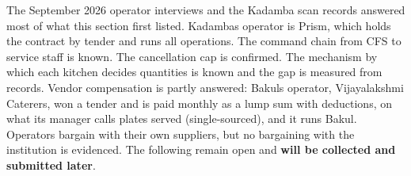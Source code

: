 \documentclass[
  10pt,
  table]{article}
\begin{document}
The September 2026 operator interviews and the Kadamba scan records answered most of what this section first listed. Kadamba\textquotesingle s operator is Prism, which holds the contract by tender and runs all operations. The command chain from CFS to service staff is known. The cancellation cap is confirmed. The mechanism by which each kitchen decides quantities is known and the gap is measured from records. Vendor compensation is partly answered: Bakul\textquotesingle s operator, Vijayalakshmi Caterers, won a tender and is paid monthly as a lump sum with deductions, on what its manager calls plates served (single-sourced), and it runs Bakul. Operators bargain with their own suppliers, but no bargaining with the institution is evidenced. The following remain open and \textbf{will be collected and submitted later}.
\end{document}
